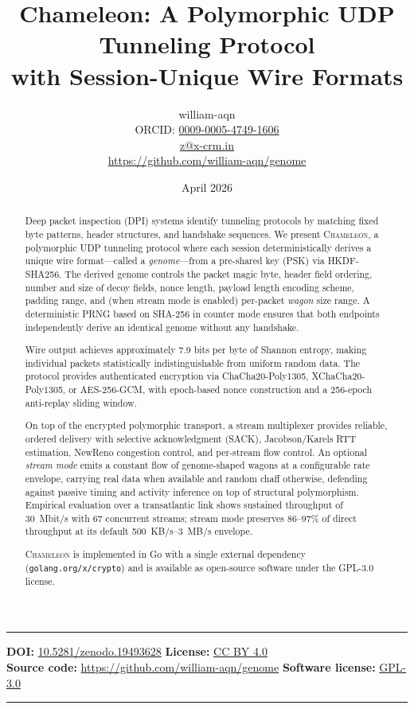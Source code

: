 \documentclass[11pt,a4paper]{article}
\title{\textbf{Chameleon: A Polymorphic UDP Tunneling Protocol\\with Session-Unique Wire Formats}}
\author{william-aqn\\
  \small ORCID: \href{https://orcid.org/0009-0005-4749-1606}{0009-0005-4749-1606}\\
  \small \href{mailto:z@x-crm.in}{z@x-crm.in}\\
  \small \url{https://github.com/william-aqn/genome}
}
\date{April 2026}
\newcommand{\chameleon}{\textsc{Chameleon}}
\newcommand{\genome}{\emph{genome}}
\begin{document}
\maketitle

\vspace{-1em}
\noindent\rule{\textwidth}{0.4pt}
\smallskip
\noindent
\textbf{DOI:} \href{https://doi.org/10.5281/zenodo.19493628}{10.5281/zenodo.19493628} \hfill
\textbf{License:} \href{https://creativecommons.org/licenses/by/4.0/}{CC BY 4.0}\\
\noindent
\textbf{Source code:} \url{https://github.com/william-aqn/genome} \hfill
\textbf{Software license:} \href{https://www.gnu.org/licenses/gpl-3.0.html}{GPL-3.0}
\smallskip
\noindent\rule{\textwidth}{0.4pt}
\medskip

\begin{abstract}
Deep packet inspection (DPI) systems identify tunneling protocols by matching fixed byte patterns, header structures, and handshake sequences. We present \chameleon{}, a polymorphic UDP tunneling protocol where each session deterministically derives a unique wire format---called a \genome{}---from a pre-shared key (PSK) via HKDF-SHA256. The derived genome controls the packet magic byte, header field ordering, number and size of decoy fields, nonce length, payload length encoding scheme, padding range, and (when stream mode is enabled) per-packet \emph{wagon} size range. A deterministic PRNG based on SHA-256 in counter mode ensures that both endpoints independently derive an identical genome without any handshake.

Wire output achieves approximately 7.9 bits per byte of Shannon entropy, making individual packets statistically indistinguishable from uniform random data. The protocol provides authenticated encryption via ChaCha20-Poly1305, XChaCha20-Poly1305, or AES-256-GCM, with epoch-based nonce construction and a 256-epoch anti-replay sliding window.

On top of the encrypted polymorphic transport, a stream multiplexer provides reliable, ordered delivery with selective acknowledgment (SACK), Jacobson/Karels RTT estimation, NewReno congestion control, and per-stream flow control. An optional \emph{stream mode} emits a constant flow of genome-shaped wagons at a configurable rate envelope, carrying real data when available and random chaff otherwise, defending against passive timing and activity inference on top of structural polymorphism. Empirical evaluation over a transatlantic link shows sustained throughput of 30~Mbit/s with 67 concurrent streams; stream mode preserves 86--97\% of direct throughput at its default 500~KB/s--3~MB/s envelope.

\chameleon{} is implemented in Go with a single external dependency (\texttt{golang.org/x/crypto}) and is available as open-source software under the GPL-3.0 license.
\end{abstract}
\end{document}

